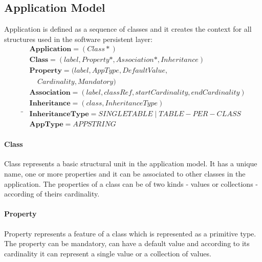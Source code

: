 \documentclass[runningheads]{comsis}
\begin{document}


\subsection{Application Model}
Application is defined as a sequence of classes and it creates the context for all structures used in the software persistent layer:
\begin{align}
& \mathbf{Application} = (Class*) \\
& 	\mathbf{Class} = (label, Property*, Association*, Inheritance) \\
& \mathbf{Property} = (label, AppType, DefaultValue, \nonumber \\ & \;\;\;\;  Cardinality, Mandatory) \\
&	\mathbf{Association} = (label, classRef, startCardinality, endCardinality)  \\
& \mathbf{Inheritance} = (class, InheritanceType) \\¨
& \mathbf{InheritanceType} = SINGLETABLE \; | \; TABLE-PER-CLASS \\
& \mathbf{AppType} = APPSTRING
\end{align}

\paragraph{Class} Class represents a basic structural unit in the application model. It has a unique name, one or more properties and it can be associated to other classes in the application. The properties of a class can be of two kinds - values or collections - according of theirs cardinality.
	 
\paragraph{Property} Property represents a feature of a class which is represented as a primitive type. The property can be mandatory, can have a default value and according to its cardinality it can represent a single value or a collection of values. 
\end{document}
